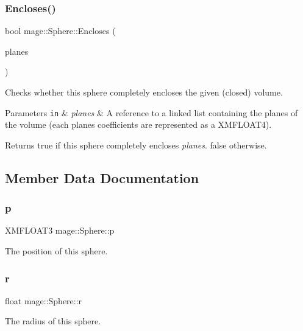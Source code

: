 \hypertarget{structmage_1_1_sphere_ad03a36fda37c1b832dee7aacfb4989fa}{}\label{structmage_1_1_sphere_ad03a36fda37c1b832dee7aacfb4989fa} 
\subsubsection{\texorpdfstring{Encloses()}{Encloses()}}
{\footnotesize\ttfamily bool mage\+::\+Sphere\+::\+Encloses (\begin{DoxyParamCaption}\item[{const \hyperlink{classmage_1_1_linked_list}{Linked\+List}$<$ X\+M\+F\+L\+O\+A\+T4 $>$ \&}]{planes }\end{DoxyParamCaption})}

Checks whether this sphere completely encloses the given (closed) volume.


\begin{DoxyParams}[1]{Parameters}
\mbox{\tt in}  & {\em planes} & A reference to a linked list containing the planes of the volume (each plane\textquotesingle{}s coefficients are represented as a {\ttfamily X\+M\+F\+L\+O\+A\+T4}). \\
\hline
\end{DoxyParams}
\begin{DoxyReturn}{Returns}
{\ttfamily true} if this sphere completely encloses {\itshape planes}. {\ttfamily false} otherwise. 
\end{DoxyReturn}


\subsection{Member Data Documentation}
\hypertarget{structmage_1_1_sphere_a3eaad90e13e18fe66a5f927a40e4a96b}{}\label{structmage_1_1_sphere_a3eaad90e13e18fe66a5f927a40e4a96b} 
\subsubsection{\texorpdfstring{p}{p}}
{\footnotesize\ttfamily X\+M\+F\+L\+O\+A\+T3 mage\+::\+Sphere\+::p}

The position of this sphere. \hypertarget{structmage_1_1_sphere_af9121b33471e72b3df2fb032f5f68151}{}\label{structmage_1_1_sphere_af9121b33471e72b3df2fb032f5f68151} 
\subsubsection{\texorpdfstring{r}{r}}
{\footnotesize\ttfamily float mage\+::\+Sphere\+::r}

The radius of this sphere. 